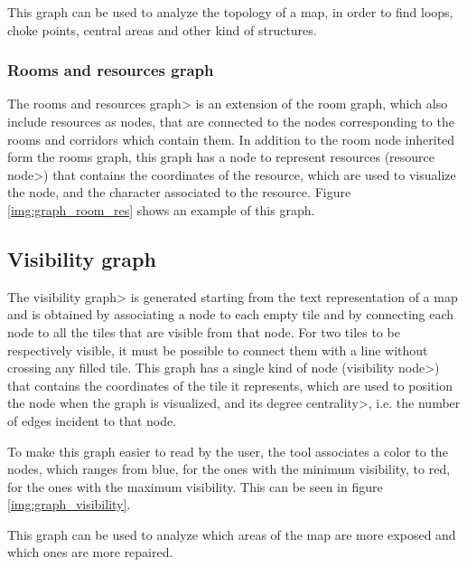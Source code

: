 \par

This graph can be used to analyze the topology of a map, in order to find loops, choke points, central areas and other kind of structures.

\subsubsection{Rooms and resources graph}

The \<rooms and resources graph> is an extension of the room graph, which also include resources as nodes, that are connected to the nodes corresponding to the rooms and corridors which contain them. In addition to the room node inherited form the rooms graph, this graph has a node to represent resources (\<resource node>) that contains the coordinates of the resource, which are used to visualize the node, and the character associated to the resource. Figure \ref{img:graph_room_res} shows an example of this graph.

\subsection{Visibility graph}

The \<visibility graph> is generated starting from the text representation of a map and is obtained by associating a node to each empty tile and by connecting each node to all the tiles that are visible from that node. For two tiles to be respectively visible, it must be possible to connect them with a line without crossing any filled tile. This graph has a single kind of node (\<visibility node>) that contains the coordinates of the tile it represents, which are used to position the node when the graph is visualized, and its \<degree centrality>, i.e. the number of edges incident to that node. 

\par

To make this graph easier to read by the user, the tool associates a color to the nodes, which ranges from blue, for the ones with the minimum visibility, to red, for the ones with the maximum visibility. This can be seen in figure \ref{img:graph_visibility}.

\par

This graph can be used to analyze which areas of the map are more exposed and which ones are more repaired.

